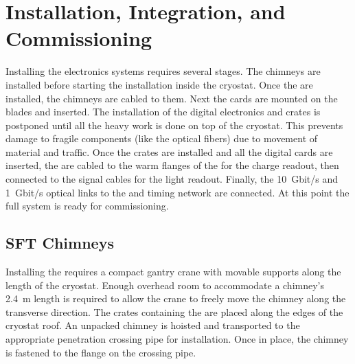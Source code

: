 \section{Installation, Integration, and Commissioning}
\label{sec:dp-tpcelec-install}

Installing the  electronics systems requires several stages. %
The chimneys are installed before starting the  installation inside the cryostat. Once the  are installed, the chimneys are cabled to them.  
Next the  cards are mounted on the blades and inserted. The installation of the digital electronics and  crates is postponed until all the heavy work is done on top of the cryostat. This prevents damage to fragile components (like the optical fibers) due to movement of material and traffic. 
Once the  crates are installed and all the digital cards are inserted, the  are cabled to the warm flanges of the  for the charge readout, then %
connected to the  signal cables for the light readout. Finally, %
the \SI{10}{Gbit/s} and \SI{1}{Gbit/s} optical links to the  and  timing network are connected. At this point %
the full system is ready for commissioning. 

\subsection{SFT Chimneys}
\label{sec:dp-tpcelec-install-sft}

Installing the  requires a compact gantry crane with movable supports along the length of the cryostat. %
Enough overhead room to accommodate a chimney's \SI{2.4}{m} length is required to allow the crane to freely move the chimney along the transverse direction. The crates containing the  are placed along the edges of the cryostat roof. An unpacked chimney is hoisted and transported to the appropriate penetration crossing pipe for installation. Once in place, the chimney is fastened to the flange on the crossing pipe. %

